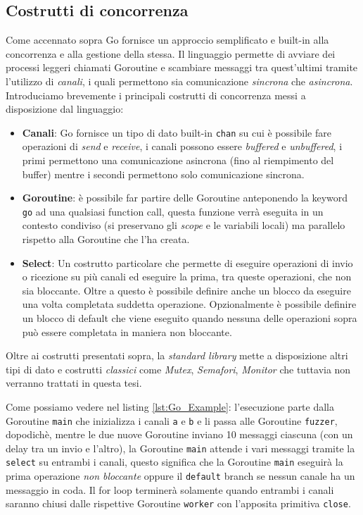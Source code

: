 \subsection{Costrutti di concorrenza}
Come accennato sopra Go fornisce un approccio semplificato e built-in alla concorrenza e alla gestione della stessa. Il linguaggio permette di avviare dei processi leggeri chiamati Goroutine e scambiare messaggi tra quest'ultimi tramite l'utilizzo di \emph{canali}, i quali permettono sia comunicazione \emph{sincrona} che \emph{asincrona}.\\
Introduciamo brevemente i principali costrutti di concorrenza messi a disposizione dal linguaggio:
\begin{itemize}
    \item \textbf{Canali}: Go fornisce un tipo di dato built-in \texttt{chan} su cui è possibile fare operazioni di \emph{send} e \emph{receive}, i canali possono essere \emph{buffered} e \emph{unbuffered}, i primi permettono una comunicazione asincrona (fino al riempimento del buffer) mentre i secondi permettono solo comunicazione sincrona.
    \item \textbf{Goroutine}: è possibile far partire delle Goroutine anteponendo la keyword \texttt{go} ad una qualsiasi function call, questa funzione verrà eseguita in un contesto condiviso (si preservano gli \emph{scope} e le variabili locali) ma parallelo rispetto alla Goroutine che l'ha creata.
    \item \textbf{Select}: Un costrutto particolare che permette di eseguire operazioni di invio o ricezione su più canali ed eseguire la prima, tra queste operazioni, che non sia bloccante. Oltre a questo è possibile definire anche un blocco da eseguire una volta completata suddetta operazione. Opzionalmente è possibile definire un blocco di default che viene eseguito quando nessuna delle operazioni sopra può essere completata in maniera non bloccante.
\end{itemize}
Oltre ai costrutti presentati sopra, la \emph{standard library} mette a disposizione altri tipi di dato e costrutti \emph{classici} come \emph{Mutex}, \emph{Semafori}, \emph{Monitor} che tuttavia non verranno trattati in questa tesi.
\newpage %

\bigskip
Come possiamo vedere nel listing \ref{lst:Go_Example}: l'esecuzione parte dalla Goroutine \texttt{main} che inizializza i canali \texttt{a} e \texttt{b} e li passa alle Goroutine \texttt{fuzzer}, dopodichè, mentre le due nuove Goroutine inviano 10 messaggi ciascuna (con un delay tra un invio e l'altro), la Goroutine \texttt{main} attende i vari messaggi tramite la \texttt{select} su entrambi i canali, questo significa che la Goroutine \texttt{main} eseguirà la prima operazione \emph{non bloccante} oppure il \texttt{default} branch se nessun canale ha un messaggio in coda. Il for loop terminerà solamente quando entrambi i canali saranno chiusi dalle rispettive Goroutine \texttt{worker} con l'apposita primitiva \texttt{close}.

